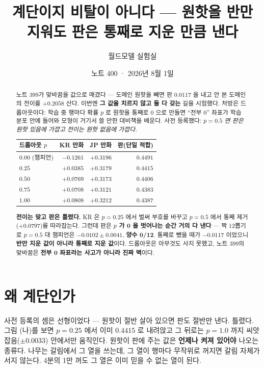 \documentclass[11pt]{article}
\begin{document}
\title{계단이지 비탈이 아니다 --- 원핫을 반만 지워도 판은 통째로 지운 만큼 낸다}
\author{월드모델 실험실}
\date{노트 400 · 2026년 8월 1일}
\maketitle

\begin{abstract}
노트 399가 맞바꿈을 값으로 매겼다 --- 도메인 원핫을 빼면 판 $0.0117$ 을
내고 안 본 도메인의 전이를 $+0.2058$ 산다. 이번엔 \textbf{그 값을 치르지
않고 둘 다 갖는} 길을 시험했다. 처방은 드롭아웃이다: 학습 중 행마다 확률
$p$ 로 원핫을 통째로 0 으로 만들면 ``전부 0'' 좌표가 학습 분포 안에 들어와
모형이 거기서 쓸 만한 대비책을 배운다. 사전 등록했다: \emph{$p=0.5$ 면
판은 원핫 있음에 가깝고 전이는 원핫 없음에 가깝다.}

\begin{center}
\begin{tabular}{lrrr}
\hline
드롭아웃 $p$ & KR 만화 & JP 만화 & 판(단일 적합) \\
\hline
$0.00$ (챔피언) & $-0.1261$ & $+0.3196$ & $0.4491$ \\
$0.25$ & $+0.0385$ & $+0.3179$ & $0.4415$ \\
$\mathbf{0.50}$ & $\mathbf{+0.0769}$ & $+0.3173$ & $0.4406$ \\
$0.75$ & $+0.0708$ & $+0.3121$ & $0.4383$ \\
$1.00$ & $+0.0808$ & $+0.3212$ & $0.4387$ \\
\hline
\end{tabular}
\end{center}

\textbf{전이는 맞고 판은 틀렸다.} KR 은 $p{=}0.25$ 에서 벌써 부호를 바꾸고
$p{=}0.5$ 에서 통째 제거($+0.0797$)를 따라잡는다. 그런데 판은
\textbf{$p$ 가 0 을 벗어나는 순간 거의 다 낸다} --- 짝 12뽑기로 $p{=}0.5$
대 챔피언은 $\mathbf{-0.0102 \pm 0.0041}$, \textbf{양수 0/12}. 통째로 뺐을
때가 $-0.0117$ 이었으니 \textbf{반만 지운 값이 아니라 통째로 지운 값}이다.
드롭아웃은 아무것도 사지 못했고, 노트 399의 맞바꿈은 \textbf{전부 0 좌표라는
사고가 아니라 진짜 벽}이다.
\end{abstract}

\section{왜 계단인가}

사전 등록의 셈은 선형이었다 --- 원핫이 절반 살아 있으면 판도 절반만 낸다.
틀렸다. 그림 (나)를 보면 $p{=}0.25$ 에서 이미 $0.4415$ 로 내려앉고 그 뒤로는
$p{=}1.0$ 까지 씨앗 잡음($\pm 0.0033$) 안에서만 움직인다. 원핫이 판에 주는
값은 \textbf{언제나 켜져 있어야} 나오는 종류다. 나무는 갈림에서 그 열을
쓰는데, 그 열이 행마다 무작위로 꺼지면 갈림 자체가 서지 않는다. 4분의 1만
꺼도 그 열은 이미 믿을 수 없는 열이 된다.
\end{document}
